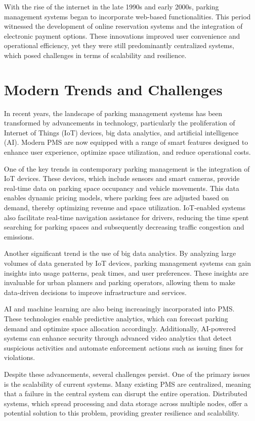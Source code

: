 \documentclass[oneside, 12pt, a4paper, draft]{book}
\begin{document}
With the rise of the internet in the late 1990s and early 2000s, parking management systems began to incorporate web-based functionalities. This period witnessed the development of online reservation systems and the integration of electronic payment options. These innovations improved user convenience and operational efficiency, yet they were still predominantly centralized systems, which posed challenges in terms of scalability and resilience.
\section{Modern Trends and Challenges}
\label{sec:org8c1a7ff}
In recent years, the landscape of parking management systems has been transformed by advancements in technology, particularly the proliferation of Internet of Things (IoT) devices, big data analytics, and artificial intelligence (AI). Modern PMS are now equipped with a range of smart features designed to enhance user experience, optimize space utilization, and reduce operational costs.

One of the key trends in contemporary parking management is the integration of IoT devices. These devices, which include sensors and smart cameras, provide real-time data on parking space occupancy and vehicle movements. This data enables dynamic pricing models, where parking fees are adjusted based on demand, thereby optimizing revenue and space utilization. IoT-enabled systems also facilitate real-time navigation assistance for drivers, reducing the time spent searching for parking spaces and subsequently decreasing traffic congestion and emissions.

Another significant trend is the use of big data analytics. By analyzing large volumes of data generated by IoT devices, parking management systems can gain insights into usage patterns, peak times, and user preferences. These insights are invaluable for urban planners and parking operators, allowing them to make data-driven decisions to improve infrastructure and services.

AI and machine learning are also being increasingly incorporated into PMS. These technologies enable predictive analytics, which can forecast parking demand and optimize space allocation accordingly. Additionally, AI-powered systems can enhance security through advanced video analytics that detect suspicious activities and automate enforcement actions such as issuing fines for violations.

Despite these advancements, several challenges persist. One of the primary issues is the scalability of current systems. Many existing PMS are centralized, meaning that a failure in the central system can disrupt the entire operation. Distributed systems, which spread processing and data storage across multiple nodes, offer a potential solution to this problem, providing greater resilience and scalability.
\end{document}
